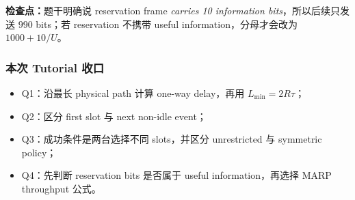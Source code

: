 \textbf{检查点：}题干明确说 reservation frame \emph{carries 10 information bits}，所以后续只发送 $990$ bits；若 reservation 不携带 useful information，分母才会改为 $1000+10/U$。

\subsubsection*{本次 Tutorial 收口}

\begin{itemize}
  \item Q1：沿最长 physical path 计算 one-way delay，再用 $L_{\min}=2R\tau$；
  \item Q2：区分 first slot 与 next non-idle event；
  \item Q3：成功条件是两台选择不同 slots，并区分 unrestricted 与 symmetric policy；
  \item Q4：先判断 reservation bits 是否属于 useful information，再选择 MARP throughput 公式。
\end{itemize}
